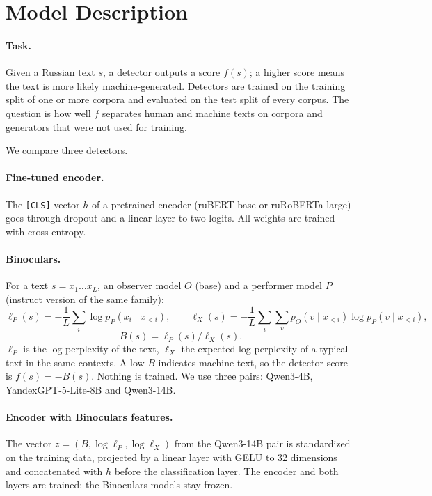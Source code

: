 \documentclass{article}
\begin{document}
\section{Model Description}
\paragraph{Task.} Given a Russian text $s$, a detector outputs a score $f(s)$; a higher score means the text is
more likely machine-generated. Detectors are trained on the training split of one or more corpora and evaluated
on the test split of every corpus. The question is how well $f$ separates human and machine texts on corpora and
generators that were not used for training.

We compare three detectors.

\paragraph{Fine-tuned encoder.} The \texttt{[CLS]} vector $h$ of a pretrained encoder (ruBERT-base or
ruRoBERTa-large) goes through dropout and a linear layer to two logits. All weights are trained with
cross-entropy.

\paragraph{Binoculars.} For a text $s = x_1 \dots x_L$, an observer model $O$ (base) and a performer model $P$
(instruct version of the same family):
$$\ell_P(s) = -\frac{1}{L}\sum_{i} \log p_P(x_i \mid x_{<i}), \qquad
\ell_X(s) = -\frac{1}{L}\sum_{i} \sum_{v} p_O(v \mid x_{<i}) \log p_P(v \mid x_{<i}),$$
$$B(s) = \ell_P(s) / \ell_X(s).$$
$\ell_P$ is the log-perplexity of the text, $\ell_X$ the expected log-perplexity of a typical text in the same
contexts. A low $B$ indicates machine text, so the detector score is $f(s) = -B(s)$. Nothing is trained. We use three pairs: Qwen3-4B, YandexGPT-5-Lite-8B
and Qwen3-14B.

\paragraph{Encoder with Binoculars features.} The vector $z = (B, \log\ell_P, \log\ell_X)$ from the Qwen3-14B
pair is standardized on the training data, projected by a linear layer with GELU to 32 dimensions and
concatenated with $h$ before the classification layer. The encoder and both layers are trained; the Binoculars
models stay frozen.
\end{document}
